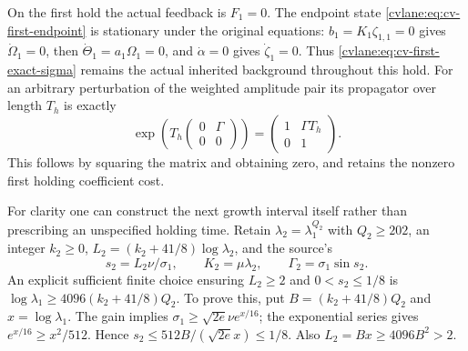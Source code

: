 On the first hold the actual feedback is $F_1=0$.
The endpoint state \eqref{cvlane:eq:cv-first-endpoint} is stationary under
the original equations: $b_1=K_1\zeta_{1,1}=0$ gives
$\dot\Omega_1=0$, then $\dot\Theta_1=a_1\Omega_1=0$,
and $\dot\alpha=0$ gives $\dot\zeta_1=0$.
Thus \eqref{cvlane:eq:cv-first-exact-sigma} remains the actual inherited
background throughout this hold. For an arbitrary perturbation of
the weighted amplitude pair its propagator over length $T_h$ is
exactly
\begin{equation}
 \exp\!\left(T_h\begin{pmatrix}0&\Gamma\\0&0\end{pmatrix}\right)
 =\begin{pmatrix}1&\Gamma T_h\\0&1\end{pmatrix}.
 \label{cvlane:eq:cv-first-hold-propagator}
\end{equation}
This follows by squaring the matrix and obtaining zero, and retains
the nonzero first holding coefficient cost.

For clarity one can construct the next growth interval itself rather
than prescribing an unspecified holding time. Retain
$\lambda_2=\lambda_1^{Q_2}$ with $Q_2\geq202$, an integer $k_2\geq0$,
$L_2=(k_2+41/8)\log\lambda_2$, and the source's
\[
 s_2=L_2\nu/\sigma_1,\qquad K_2=\mu\lambda_2,
 \qquad\Gamma_2=\sigma_1\sin s_2.
\]
An explicit sufficient finite choice ensuring $L_2\geq2$ and
$0<s_2\leq1/8$ is
$\log\lambda_1\geq4096(k_2+41/8)Q_2$.
To prove this, put $B=(k_2+41/8)Q_2$ and $x=\log\lambda_1$.
The gain implies $\sigma_1\geq\sqrt{2e}\nu e^{x/16}$;
the exponential series gives $e^{x/16}\geq x^2/512$.
Hence $s_2\leq512B/(\sqrt{2e}x)\leq1/8$.
Also $L_2=Bx\geq4096B^2>2$.

